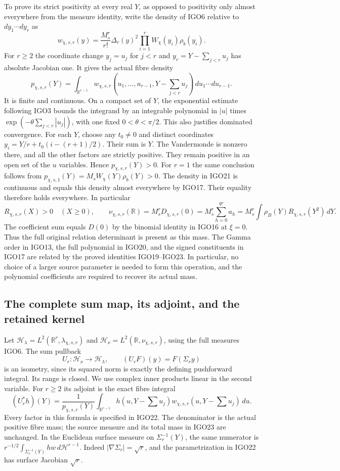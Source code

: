 To prove its strict positivity at every real $Y$, as opposed to
positivity only almost everywhere from the measure identity,
write the density of IGO6 relative to $dy_1\cdots dy_r$ as
\[
 w_{\chi,s,r}(y)
  =\frac{M_s^r}{r!}\Delta_r(y)^2
                  \prod_{i=1}^r W_\chi(y_i)\rho_b(y_i).
\]
For $r\geq2$ the coordinate change
$y_j=u_j$ for $j<r$ and $y_r=Y-\sum_{j<r}u_j$ has
absolute Jacobian one. It gives the actual fibre density
\[
 p_{\chi,s,r}(Y)=\int_{\mathbb R^{r-1}}
 w_{\chi,s,r}(u_1,\ldots,u_{r-1},Y-\textstyle\sum_{j<r}u_j)
                 \,du_1\cdots du_{r-1}.
 \tag{IGO22}
\]
It is finite and continuous. On a compact set of $Y$, the
exponential estimate following IGO3 bounds the integrand by
an integrable polynomial in $|u|$ times
$\exp(-\theta\sum_{j<r}|u_j|)$, with one fixed
$0<\theta<\pi/2$. This also justifies dominated convergence.
For each $Y$, choose any $t_0\ne0$ and distinct coordinates
$y_i=Y/r+t_0(i-(r+1)/2)$. Their sum is $Y$.
The Vandermonde is nonzero there, and all the other factors
are strictly positive. They remain positive in an open set
of the $u$ variables. Hence $p_{\chi,s,r}(Y)>0$.
For $r=1$ the same conclusion follows from
$p_{\chi,s,1}(Y)=M_s W_\chi(Y)\rho_b(Y)>0$.
The density in IGO21 is continuous and equals this density
almost everywhere by IGO17. Their equality therefore holds
everywhere. In particular
\[
 R_{\chi,s,r}(X)>0\quad(X\geq0),\qquad
 \nu_{\chi,s,r}(\mathbb R)
 =M_s^rD_{\chi,s,r}(0)
 =M_s^r\sum_{h=0}^{qr}a_h
 =M_s^r\int\rho_B(Y)R_{\chi,s,r}(Y^2)\,dY.
 \tag{IGO23}
\]
The coefficient sum equals $D(0)$ by the binomial identity in
IGO16 at $\xi=0$. Thus the full original relation determinant
is present as this mass. The Gamma order in IGO13, the full
polynomial in IGO20, and the signed constituents in IGO17 are
related by the proved identities IGO19--IGO23. In particular,
no choice of a larger source parameter is needed to form
this operation, and the polynomial coefficients are required
to recover its actual mass.

\subsection{The complete sum map, its adjoint, and the retained kernel}
Let $\mathcal H_{\lambda}=L^2(\mathbb R^r,\lambda_{\chi,s,r})$
and $\mathcal H_{\nu}=L^2(\mathbb R,\nu_{\chi,s,r})$, using
the full measures IGO6. The sum pullback
\[
 U_r:\mathcal H_{\nu}\longrightarrow\mathcal H_{\lambda},
 \qquad (U_rF)(y)=F(\Sigma_r y)
 \tag{IGO24}
\]
is an isometry, since its squared norm is exactly the defining
pushforward integral. Its range is closed. We use complex
inner products linear in the second variable. For $r\geq2$
its adjoint is the exact fibre integral
\[
 (U_r^*h)(Y)=\frac{1}{p_{\chi,s,r}(Y)}
  \int_{\mathbb R^{r-1}}
    h(u,Y-\textstyle\sum u_j)
    w_{\chi,s,r}(u,Y-\textstyle\sum u_j)\,du.
 \tag{IGO25}
\]
Every factor in this formula is specified in IGO22. The
denominator is the actual positive fibre mass; the source
measure and its total mass in IGO23 are unchanged. In the
Euclidean surface measure on $\Sigma_r^{-1}(Y)$, the same
numerator is $r^{-1/2}\int_{\Sigma_r^{-1}(Y)}hw\,d\mathcal H^{r-1}$.
Indeed $|\nabla\Sigma_r|=\sqrt r$, and the parametrization
in IGO22 has surface Jacobian $\sqrt r$.

